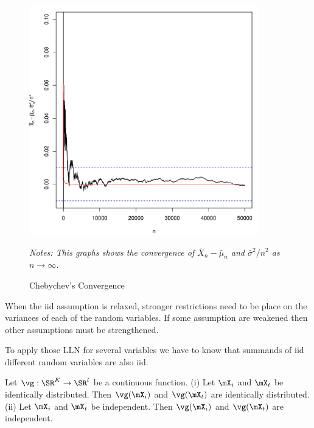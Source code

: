 \begin{figure}[H]
  \caption{Chebychev's Convergence}
    \label{fig:chebychev}
         \centering
    \begin{minipage}{.9\linewidth}
\begin{knitrout}
\color{fgcolor}

{\centering \includegraphics[width=10cm,height=10cm]{figure/cheby-convergence-1} 

}


\end{knitrout}
\footnotesize
		\emph{Notes: This graphs shows the convergence of $\bar{X}_n - \bar{\mu}_n$ and $\bar{\sigma}^2 / n^2$ as $n\to\infty$.}
	\end{minipage}
\end{figure}

\begin{remark}
  When the iid assumption is relaxed, stronger restrictions need to be place on the variances of each of the random variables. If some assumption are weakened then other assumptions must be strengthened. 
\end{remark}

To apply those LLN for several variables we have to know that summands of iid different random variables are also iid.

\begin{proposition}
	Let $\vg:\SR^K\to \SR^l$ be a continuous function. (i) Let $\mX_i$ and $\mX_t$ be identically distributed. Then $\vg(\mX_i)$ and $\vg(\mX_t)$ are identically distributed. (ii) Let $\mX_i$ and $\mX_t$ be independent. Then $\vg(\mX_i)$ and $\vg(\mX_t)$ are independent.
\end{proposition}

